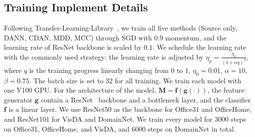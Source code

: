 \subsection{Training Implement Details}
Following Transfer-Learning-Library~\cite{tllib}, we train all five methods (Source only, DANN, CDAN, MDD, MCC) through SGD with $0.9$ momentum, and the learning rate of ResNet backbone is scaled by $0.1$. We schedule the learning rate with the commonly used strategy: the learning rate is adjusted by $\eta_p=\frac{\eta_0}{(1+\alpha q)^{\beta}}$,  where $q$ is the training progress linearly changing from $0$ to $1$, $\eta_0=0.01$, $\alpha=10$, $\beta=0.75$. The batch size is set to $32$ for all training. We train each model with one V100 GPU. For the architecture of the model, $\boldsymbol{M}=\textbf{f}(\textbf{g}(\cdot))$, the feature generator $\textbf{g}$ contain a ResNet~\cite{ResNet} backbone and a bottleneck layer, and the classifier $\textbf{f}$ is a linear layer. We use ResNet50 as the backbone for Office31 and OfficeHome, and ResNet101 for VisDA and DomainNet. We train every model for 3000 steps on Office31, OfficeHome, and VisDA, and 6000 steps on DomainNet in total. 

